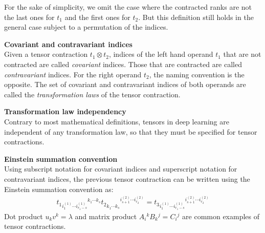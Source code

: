 For the sake of simplicity, we omit the case where the contracted ranks are not the last ones for $t_1$ and the first ones for $t_2$. But this definition still holds in the general case subject to a permutation of the indices.

\begin{definition}\textbf{Covariant and contravariant indices}\\
Given a tensor contraction $t_1 \otimes t_2$, indices of the left hand operand $t_1$ that are not contracted are called \emph{covariant} indices. Those that are contracted are called \emph{contravariant} indices. For the right operand $t_2$, the naming convention is the opposite. 
The set of covariant and contravariant indices of both operands are called the \emph{transformation laws} of the tensor contraction.
\end{definition}

\begin{remark}\textbf{Transformation law independency}\\
Contrary to most mathematical definitions, tensors in deep learning are independent of any transformation law, so that they must be specified for tensor contractions.
\end{remark}

\begin{remark}\textbf{Einstein summation convention}\\
Using subscript notation for covariant indices and superscript notation for contravariant indices, the previous tensor contraction can be written using the Einstein summation convention as:
\begin{gather}
t_1 \hspace{0pt}_{i_1^{(1)} \cdots i_{r_1-s}^{(1)} } \hspace{0pt}^{ k_1 \cdots k_s} 
t_2 \hspace{0pt}_{ k_1^{\phantom{(}} \cdots k_s^{\phantom{(}}} \hspace{0pt}^{i_{s+1}^{(2)} \cdots i_{r_2}^{(2)}} =
t_3 \hspace{0pt}_ {i_1^{(1)} \cdots i_{r_1-s}^{(1)} } \hspace{0pt}^{i_{s+1}^{(2)} \cdots i_{r_2}^{(2)}}
\label{indices}
\end{gather}
Dot product $u_k v^k = \lambda $ and matrix product $A_i\hspace{0pt}^k B_k\hspace{0pt}^j = C_i\hspace{0pt}^j$ are common examples of tensor contractions.
\end{remark}

